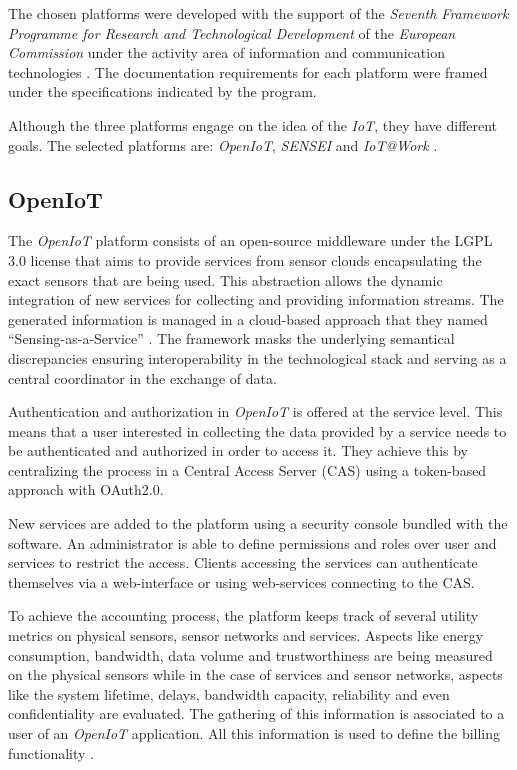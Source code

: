 \documentclass[journal]{IEEEtran}
\begin{document}
  The chosen platforms were developed with the support of the \emph{Seventh Framework Programme for Research and Technological Development} of the \emph{European Commission} under the activity area of information and communication technologies \cite{FP7, FP7-ICT, ICT}. The documentation requirements for each platform were framed under the specifications indicated by the program.

  Although the three platforms engage on the idea of the \emph{IoT}, they have different goals. The selected platforms are: \emph{OpenIoT}, \emph{SENSEI}  and \emph{IoT@Work} \cite{OpenIoT, SENSEI, IoTWork}.

  \subsection{OpenIoT}

  The \emph{OpenIoT} platform \cite{OpenIoTWeb} consists of an open-source middleware under the LGPL 3.0 license that aims to provide services from sensor clouds encapsulating the exact sensors that are being used. This abstraction allows the dynamic integration of new services for collecting and providing information streams. The generated information is managed in a cloud-based approach that they named ``Sensing-as-a-Service'' \cite{Baldini2012}.  The framework masks the underlying semantical discrepancies ensuring interoperability in the technological stack and serving as a central coordinator in the exchange of data.

  Authentication and authorization in \emph{OpenIoT} is offered at the service level. This means that a user interested in collecting the data provided by a service needs to be authenticated and authorized in order to access it. They achieve this by centralizing the process in a Central Access Server (CAS) using a token-based approach with OAuth2.0. 

  New services are added to the platform using a security console bundled with the software. An administrator is able to define permissions and roles over user and services to restrict the access. Clients accessing the services can authenticate themselves via a web-interface or using web-services connecting to the CAS.

  To achieve the accounting process, the platform keeps track of several utility metrics on physical sensors, sensor networks and services. Aspects like energy consumption, bandwidth, data volume and trustworthiness are being measured on the physical sensors while in the case of services and sensor networks, aspects like the system lifetime, delays, bandwidth capacity, reliability and even confidentiality are evaluated. The gathering of this information is associated to a user of an \emph{OpenIoT} application. All this information is used to define the billing functionality \cite{Calbimonte}.
\end{document}
